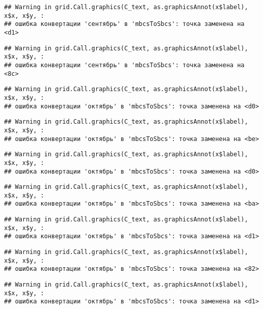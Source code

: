 \documentclass[
]{article}
\begin{document}
\begin{verbatim}
## Warning in grid.Call.graphics(C_text, as.graphicsAnnot(x$label), x$x, x$y, :
## ошибка конвертации 'сентябрь' в 'mbcsToSbcs': точка заменена на <d1>
\end{verbatim}

\begin{verbatim}
## Warning in grid.Call.graphics(C_text, as.graphicsAnnot(x$label), x$x, x$y, :
## ошибка конвертации 'сентябрь' в 'mbcsToSbcs': точка заменена на <8c>
\end{verbatim}

\begin{verbatim}
## Warning in grid.Call.graphics(C_text, as.graphicsAnnot(x$label), x$x, x$y, :
## ошибка конвертации 'октябрь' в 'mbcsToSbcs': точка заменена на <d0>
\end{verbatim}

\begin{verbatim}
## Warning in grid.Call.graphics(C_text, as.graphicsAnnot(x$label), x$x, x$y, :
## ошибка конвертации 'октябрь' в 'mbcsToSbcs': точка заменена на <be>
\end{verbatim}

\begin{verbatim}
## Warning in grid.Call.graphics(C_text, as.graphicsAnnot(x$label), x$x, x$y, :
## ошибка конвертации 'октябрь' в 'mbcsToSbcs': точка заменена на <d0>
\end{verbatim}

\begin{verbatim}
## Warning in grid.Call.graphics(C_text, as.graphicsAnnot(x$label), x$x, x$y, :
## ошибка конвертации 'октябрь' в 'mbcsToSbcs': точка заменена на <ba>
\end{verbatim}

\begin{verbatim}
## Warning in grid.Call.graphics(C_text, as.graphicsAnnot(x$label), x$x, x$y, :
## ошибка конвертации 'октябрь' в 'mbcsToSbcs': точка заменена на <d1>
\end{verbatim}

\begin{verbatim}
## Warning in grid.Call.graphics(C_text, as.graphicsAnnot(x$label), x$x, x$y, :
## ошибка конвертации 'октябрь' в 'mbcsToSbcs': точка заменена на <82>
\end{verbatim}

\begin{verbatim}
## Warning in grid.Call.graphics(C_text, as.graphicsAnnot(x$label), x$x, x$y, :
## ошибка конвертации 'октябрь' в 'mbcsToSbcs': точка заменена на <d1>
\end{verbatim}
\end{document}
